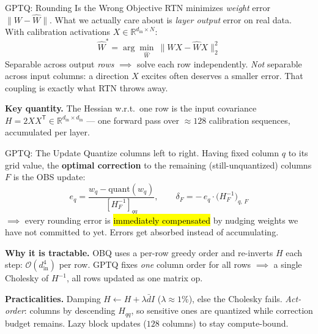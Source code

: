 \documentclass[aspectratio=169, 11pt]{beamer}
\begin{document}
\begin{frame}{GPTQ: Rounding Is the Wrong Objective}
  RTN minimizes \emph{weight} error $\|W - \hat{W}\|$. What we actually care about is \emph{layer output}
  error on real data. With calibration activations $X \in \mathbb{R}^{d_{\text{in}} \times N}$:
  \[
    \boxed{\ \hat{W}^\ast = \arg\min_{\hat{W}} \ \big\| W X - \hat{W} X \big\|_2^2 \ }
  \]
  Separable across output \emph{rows} $\implies$ solve each row independently. \emph{Not} separable
  across input columns: a direction $X$ excites often deserves a smaller error. That coupling is
  exactly what RTN throws away.

  \textbf{Key quantity.} The Hessian w.r.t.\ one row is the input covariance
  $H = 2 X X^{\mathsf{T}} \in \mathbb{R}^{d_{\text{in}} \times d_{\text{in}}}$ --- one forward pass over
  $\approx 128$ calibration sequences, accumulated per layer.
\end{frame}

\begin{frame}{GPTQ: The Update}
  Quantize columns left to right. Having fixed column $q$ to its grid value, the \textbf{optimal
  correction} to the remaining (still-unquantized) columns $F$ is the OBS update:
  \[
    e_q = \frac{w_q - \mathrm{quant}(w_q)}{[H_F^{-1}]_{qq}},
    \qquad
    \delta_F = -\,e_q \cdot \big(H_F^{-1}\big)_{q,\,F}
  \]
  $\implies$ every rounding error is \hl{immediately compensated} by nudging weights we have not
  committed to yet. Errors get absorbed instead of accumulating.

  \textbf{Why it is tractable.} OBQ uses a per-row greedy order and re-inverts $H$ each step:
  $\mathcal{O}(d_{\text{in}}^4)$ per row. GPTQ fixes \emph{one} column order for all rows $\implies$ a
  single Cholesky of $H^{-1}$, all rows updated as one matrix op.

  \textbf{Practicalities.} Damping $H \leftarrow H + \lambda \bar{d} I$ ($\lambda \approx 1\%$), else the
  Cholesky fails. \emph{Act-order}: columns by descending $H_{qq}$, so sensitive ones are quantized
  while correction budget remains. Lazy block updates ($128$ columns) to stay compute-bound.
\end{frame}
\end{document}
